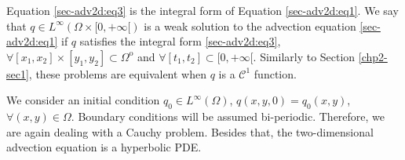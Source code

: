Equation \eqref{sec-adv2d:eq3} is the integral form of Equation 
\eqref{sec-adv2d:eq1}. We say that ${q} \in 
L^{\infty}{(\Omega \times [0, +\infty[ )}$ is a weak
solution to the advection equation \eqref{sec-adv2d:eq1} if ${q}$
satisfies the integral form \eqref{sec-adv2d:eq3}, 
$\forall [x_1,x_2]\times[y_1,y_2] \subset \Omega^{\mathrm{o}}$ and 
$\forall [t_1,t_2] \subset [0,+\infty[$.
Similarly to Section \ref{chp2-sec1}, these problems are equivalent
when  ${q}$ is a $\mathcal{C}^1$ function.

We consider an initial condition ${q_0} \in L^{\infty}{(\Omega)}$,
${q}(x,y,0) =  {q_0}(x,y)$, $\forall (x,y) \in \Omega$.
Boundary conditions will be assumed bi-periodic.
Therefore, we are again dealing with a Cauchy problem. Besides that, the 
two-dimensional advection equation is a hyperbolic PDE.

